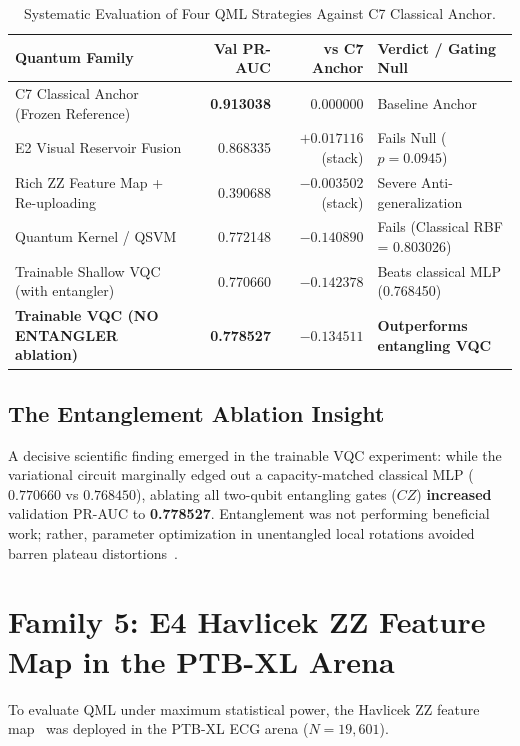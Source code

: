 \documentclass[11pt,a4paper]{report}
\begin{document}
\begin{table}[H]
\centering
\small
\begin{tabularx}{\textwidth}{lrrX}
\toprule
\textbf{Quantum Family} & \textbf{Val PR-AUC} & \textbf{vs C7 Anchor} & \textbf{Verdict / Gating Null} \\
\midrule
C7 Classical Anchor (Frozen Reference) & \textbf{0.913038} & 0.000000 & Baseline Anchor \\
E2 Visual Reservoir Fusion & 0.868335 & $+0.017116$ (stack) & Fails Null ($p = 0.0945$) \\
Rich ZZ Feature Map + Re-uploading & 0.390688 & $-0.003502$ (stack) & Severe Anti-generalization \\
Quantum Kernel / QSVM & 0.772148 & $-0.140890$ & Fails (Classical RBF = 0.803026) \\
Trainable Shallow VQC (with entangler) & 0.770660 & $-0.142378$ & Beats classical MLP (0.768450) \\
\textbf{Trainable VQC (NO ENTANGLER ablation)} & \textbf{0.778527} & $-0.134511$ & \textbf{Outperforms entangling VQC} \\
\bottomrule
\end{tabularx}
\caption{Systematic Evaluation of Four QML Strategies Against C7 Classical Anchor.}
\label{tab:e3_qml_results}
\end{table}

\subsection{The Entanglement Ablation Insight}
A decisive scientific finding emerged in the trainable VQC experiment: while the variational circuit marginally edged out a capacity-matched classical MLP ($0.770660$ vs $0.768450$), ablating all two-qubit entangling gates ($CZ$) \textbf{increased} validation PR-AUC to \textbf{0.778527}. Entanglement was not performing beneficial work; rather, parameter optimization in unentangled local rotations avoided barren plateau distortions~\cite{mcclean2018barren}.

\section{Family 5: E4 Havlicek ZZ Feature Map in the PTB-XL Arena}
To evaluate QML under maximum statistical power, the Havlicek ZZ feature map~\cite{havlicek2019supervised} was deployed in the PTB-XL ECG arena ($N=19,601$).
\end{document}
